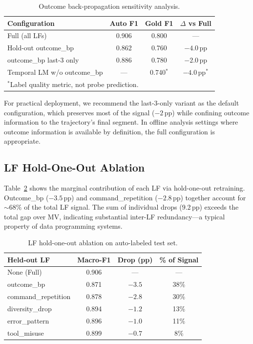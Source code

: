 \documentclass[11pt]{article}
\begin{document}
\begin{table}[t]
\centering
\caption{Outcome back-propagation sensitivity analysis.}
\label{tab:outcome_sensitivity}
\small
\begin{tabular}{lccc}
\toprule
Configuration & Auto F1 & Gold F1 & $\Delta$ vs Full \\
\midrule
Full (all LFs) & 0.906 & 0.800 & --- \\
Hold-out outcome\_bp & 0.862 & 0.760 & $-4.0$\,pp \\
outcome\_bp last-3 only & 0.886 & 0.780 & $-2.0$\,pp \\
Temporal LM w/o outcome\_bp & --- & 0.740$^*$ & $-4.0$\,pp$^*$ \\
\bottomrule
\multicolumn{4}{l}{\small $^*$Label quality metric, not probe prediction.}
\end{tabular}
\end{table}

For practical deployment, we recommend the last-3-only variant as the default configuration, which preserves most of the signal ($-2$\,pp) while confining outcome information to the trajectory's final segment.
In offline analysis settings where outcome information is available by definition, the full configuration is appropriate.

\subsection{LF Hold-One-Out Ablation}
\label{sec:lf_ablation}

Table~\ref{tab:lf_holdout} shows the marginal contribution of each LF via hold-one-out retraining.
Outcome\_bp ($-3.5$\,pp) and command\_repetition ($-2.8$\,pp) together account for ${\sim}68\%$ of the total LF signal.
The sum of individual drops ($9.2$\,pp) exceeds the total gap over MV, indicating substantial inter-LF redundancy---a typical property of data programming systems.

\begin{table}[t]
\centering
\caption{LF hold-one-out ablation on auto-labeled test set.}
\label{tab:lf_holdout}
\small
\begin{tabular}{lccc}
\toprule
Held-out LF & Macro-F1 & Drop (pp) & \% of Signal \\
\midrule
None (Full) & 0.906 & --- & --- \\
outcome\_bp & 0.871 & $-3.5$ & 38\% \\
command\_repetition & 0.878 & $-2.8$ & 30\% \\
diversity\_drop & 0.894 & $-1.2$ & 13\% \\
error\_pattern & 0.896 & $-1.0$ & 11\% \\
tool\_misuse & 0.899 & $-0.7$ & 8\% \\
\bottomrule
\end{tabular}
\end{table}
\end{document}
